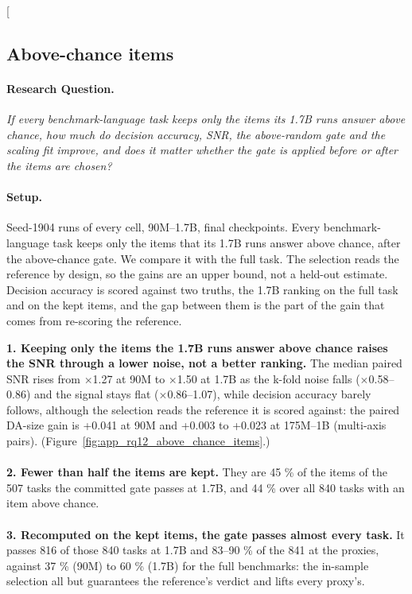 \clearpage
\twocolumn[{%
\subsection{Above-chance items}
\label{app:rq12_above_chance_items}

\noindent\begin{minipage}[t]{0.485\textwidth}
\vspace{0pt}
\paragraph{Research Question.} \emph{If every benchmark-language task keeps only the items its 1.7B runs answer above chance, how much do decision accuracy, SNR, the above-random gate and the scaling fit improve, and does it matter whether the gate is applied before or after the items are chosen?}

\paragraph{Setup.} Seed-1904 runs of every cell, 90M--1.7B, final checkpoints. Every benchmark-language task keeps only the items that its 1.7B runs answer above chance, after the above-chance gate. We compare it with the full task. The selection reads the reference by design, so the gains are an upper bound, not a held-out estimate. Decision accuracy is scored against two truths, the 1.7B ranking on the full task and on the kept items, and the gap between them is the part of the gain that comes from re-scoring the reference.
\end{minipage}\hfill
\begin{minipage}[t]{0.485\textwidth}
\vspace{0pt}
\begin{rqfinding}
\textbf{1. Keeping only the items the 1.7B runs answer above chance raises the SNR through a lower noise, not a better ranking.} The median paired SNR rises from $\times$1.27 at 90M to $\times$1.50 at 1.7B as the k-fold noise falls ($\times$0.58--0.86) and the signal stays flat ($\times$0.86--1.07), while decision accuracy barely follows, although the selection reads the reference it is scored against: the paired DA-size gain is +0.041 at 90M and +0.003 to +0.023 at 175M--1B (multi-axis pairs). (Figure~\ref{fig:app_rq12_above_chance_items}.)
\\
\\
\textbf{2. Fewer than half the items are kept.} They are 45 \% of the items of the 507 tasks the committed gate passes at 1.7B, and 44 \% over all 840 tasks with an item above chance.
\\
\\
\textbf{3. Recomputed on the kept items, the gate passes almost every task.} It passes 816 of those 840 tasks at 1.7B and 83--90 \% of the 841 at the proxies, against 37 \% (90M) to 60 \% (1.7B) for the full benchmarks: the in-sample selection all but guarantees the reference's verdict and lifts every proxy's.
\end{rqfinding}
\end{minipage}

}
